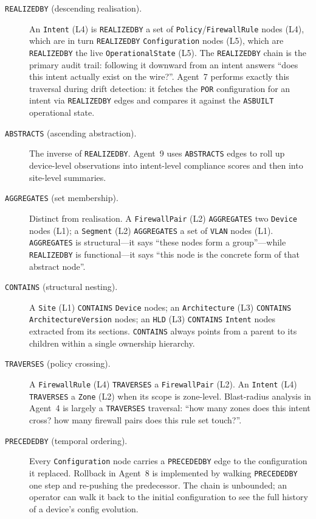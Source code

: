 \documentclass[acmtog]{acmart}
\renewcommand\_{\textunderscore\allowbreak}
\begin{document}
\begin{description}
  \item[\texttt{REALIZED\_BY} (descending realisation).]
    An \texttt{Intent} (L4) is \texttt{REALIZED\_BY} a set of
    \texttt{Policy}/\texttt{FirewallRule} nodes (L4), which are in
    turn \texttt{REALIZED\_BY} \texttt{Configuration} nodes (L5),
    which are \texttt{REALIZED\_BY} the live
    \texttt{OperationalState} (L5). The \texttt{REALIZED\_BY} chain
    is the primary audit trail: following it downward from an intent
    answers ``does this intent actually exist on the wire?''. Agent~7
    performs exactly this traversal during drift detection: it
    fetches the \texttt{POR} configuration for an intent via
    \texttt{REALIZED\_BY} edges and compares it against the
    \texttt{AS\_BUILT} operational state.

  \item[\texttt{ABSTRACTS} (ascending abstraction).]
    The inverse of \texttt{REALIZED\_BY}. Agent~9 uses
    \texttt{ABSTRACTS} edges to roll up device-level observations
    into intent-level compliance scores and then into site-level
    summaries.

  \item[\texttt{AGGREGATES} (set membership).]
    Distinct from realisation. A \texttt{FirewallPair} (L2)
    \texttt{AGGREGATES} two \texttt{Device} nodes (L1); a
    \texttt{Segment} (L2) \texttt{AGGREGATES} a set of
    \texttt{VLAN} nodes (L1). \texttt{AGGREGATES} is structural---it
    says ``these nodes form a group''---while \texttt{REALIZED\_BY}
    is functional---it says ``this node is the concrete form of that
    abstract node''.

  \item[\texttt{CONTAINS} (structural nesting).]
    A \texttt{Site} (L1) \texttt{CONTAINS} \texttt{Device} nodes;
    an \texttt{Architecture} (L3) \texttt{CONTAINS}
    \texttt{ArchitectureVersion} nodes; an \texttt{HLD} (L3)
    \texttt{CONTAINS} \texttt{Intent} nodes extracted from its
    sections. \texttt{CONTAINS} always points from a parent to its
    children within a single ownership hierarchy.

  \item[\texttt{TRAVERSES} (policy crossing).]
    A \texttt{FirewallRule} (L4) \texttt{TRAVERSES} a
    \texttt{FirewallPair} (L2). An \texttt{Intent} (L4)
    \texttt{TRAVERSES} a \texttt{Zone} (L2) when its scope is
    zone-level. Blast-radius analysis in Agent~4 is largely a
    \texttt{TRAVERSES} traversal: ``how many zones does this intent
    cross? how many firewall pairs does this rule set touch?''.

  \item[\texttt{PRECEDED\_BY} (temporal ordering).]
    Every \texttt{Configuration} node carries a
    \texttt{PRECEDED\_BY} edge to the configuration it replaced.
    Rollback in Agent~8 is implemented by walking
    \texttt{PRECEDED\_BY} one step and re-pushing the predecessor.
    The chain is unbounded; an operator can walk it back to the
    initial configuration to see the full history of a device's
    config evolution.
\end{description}
\end{document}
